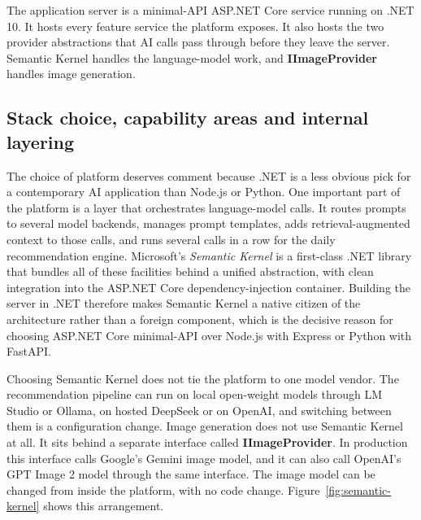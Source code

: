The application server is a minimal-API ASP.NET Core service running on .NET 10. It hosts every feature service the platform exposes. It also hosts the two provider abstractions that AI calls pass through before they leave the server. Semantic Kernel handles the language-model work, and \textbf{IImageProvider} handles image generation.

\subsection{Stack choice, capability areas and internal layering}
\label{subsec:why-dotnet}

The choice of platform deserves comment because .NET is a less obvious pick for a contemporary AI application than Node.js or Python. One important part of the platform is a layer that orchestrates language-model calls. It routes prompts to several model backends, manages prompt templates, adds retrieval-augmented context to those calls, and runs several calls in a row for the daily recommendation engine. Microsoft's \emph{Semantic Kernel} \cite{semantickernel} is a first-class .NET library that bundles all of these facilities behind a unified abstraction, with clean integration into the ASP.NET Core dependency-injection container. Building the server in .NET therefore makes Semantic Kernel a native citizen of the architecture rather than a foreign component, which is the decisive reason for choosing ASP.NET Core minimal-API over Node.js with Express or Python with FastAPI.

Choosing Semantic Kernel does not tie the platform to one model vendor. The recommendation pipeline can run on local open-weight models through LM Studio or Ollama, on hosted DeepSeek or on OpenAI, and switching between them is a configuration change. Image generation does not use Semantic Kernel at all. It sits behind a separate interface called \textbf{IImageProvider}. In production this interface calls Google's Gemini image model, and it can also call OpenAI's GPT Image 2 model through the same interface. The image model can be changed from inside the platform, with no code change. Figure~\ref{fig:semantic-kernel} shows this arrangement.

